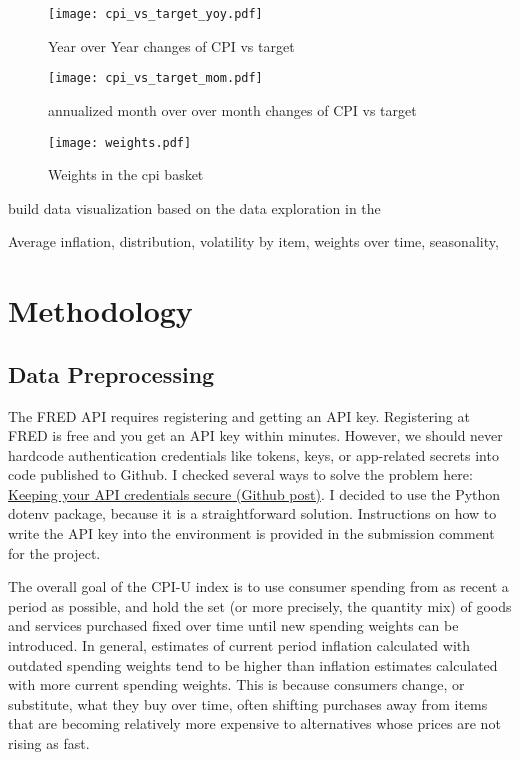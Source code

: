 \documentclass[12pt]{article}
\begin{document}
\begin{figure}[h]
    \centering
    \texttt{[image: cpi\_vs\_target\_yoy.pdf]}
    \caption{Year over Year changes of CPI vs target}
    \label{fig:cpi_vs_target_yoy}
\end{figure}


\begin{figure}[h]
    \centering
    \texttt{[image: cpi\_vs\_target\_mom.pdf]}
    \caption{annualized month over over month changes of CPI vs target}
    \label{fig:cpi_vs_target_mom}
\end{figure}

\begin{figure}[h]
    \centering
    \texttt{[image: weights.pdf]}
    \caption{Weights in the cpi basket}
    \label{fig:weights}
\end{figure}

 build data visualization based on the data exploration in the 

Average inflation, distribution, volatility by item, weights over time, seasonality, 

\section{Methodology}
\subsection{Data Preprocessing}

The FRED API requires registering and getting an API key. Registering at FRED is free and you get an API key within minutes. However, we should never hardcode authentication credentials like tokens, keys, or app-related secrets into code published to Github.  
I checked several ways to solve the problem here: \href{https://docs.github.com/en/rest/overview/keeping-your-api-credentials-secure?apiVersion=2022-11-28}{Keeping your API credentials secure (Github post)}. I decided to use the Python dotenv package, because it is a straightforward solution. Instructions on how to write the API key into the environment is provided in the submission comment for the project. 


The overall goal of the CPI-U index is to use consumer spending from as recent a period as possible, and hold the set (or more precisely, the quantity mix) of goods and services purchased fixed over time until new spending weights can be introduced. In general, estimates of current period inflation calculated with outdated spending weights tend to be higher than inflation estimates calculated with more current spending weights. This is because consumers change, or substitute, what they buy over time, often shifting purchases away from items that are becoming relatively more expensive to alternatives whose prices are not rising as fast.
\end{document}
